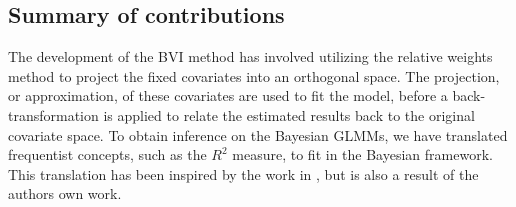 \subsection*{Summary of contributions}
The development of the BVI method has involved utilizing the relative weights method \citep{johnson_relative_weights} to project the fixed covariates into an orthogonal space. The projection, or approximation, of these covariates are used to fit the model, before a back-transformation is applied to relate the estimated results back to the original covariate space. To obtain inference on the Bayesian GLMMs, we have translated frequentist concepts, such as the $R^2$ measure, to fit in the Bayesian framework. This translation has been inspired by the work in \citet{gelman2017rsquared}, but is also a result of the authors own work. 
